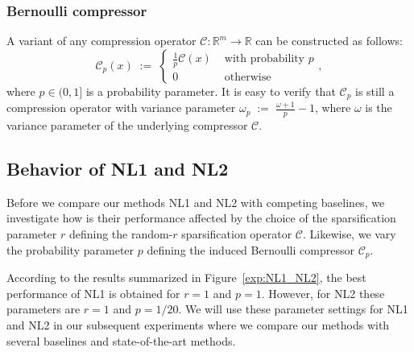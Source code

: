 \documentclass[12pt]{article}
\newcommand{\eqdef}{\; { := }\;}
\newcommand{\R}{\mathbb{R}}
\newcommand{\cC}{{\mathcal{C}}}
\begin{document}
\subsubsection{Bernoulli compressor} \label{sec:Bernoulli}
A variant of any compression operator $\cC:\R^m \to \R$ can be constructed as follows:
\begin{equation}\label{eq:Qp}
	\cC_p(x) \eqdef \left\{ \begin{array}{rl}
		\frac{1}{p}\cC(x) & \mbox{ with probability $p$} \\
		0 &\mbox{ otherwise}
	\end{array}, \right.
\end{equation}
where $p\in (0, 1]$ is a probability parameter. It is easy to verify that $\cC_p$ is still a compression operator with variance parameter $\omega_p \eqdef \frac{\omega+1}{p} - 1$, where $\omega$ is the variance parameter of the underlying compressor $\cC$.


\subsection{Behavior of {\sf NL1} and {\sf NL2}}

Before we compare our methods {\sf NL1} and {\sf NL2} with competing baselines,  we investigate how is their performance affected by the choice of the  sparsification parameter $r$ defining the random-$r$ sparsification operator  $\cC$. Likewise, we vary the probability parameter $p$ defining the induced Bernoulli compressor  $\cC_p$.


According to the results summarized in  Figure~\ref{exp:NL1_NL2}, the best performance of {\sf NL1} is obtained for $r=1$ and $p=1$. However, for {\sf NL2} these parameters are $r=1$ and $p=1/20$. We will use these  parameter settings for {\sf NL1} and {\sf NL2} in our subsequent experiments where we compare our methods with several baselines and state-of-the-art methods.
\end{document}
